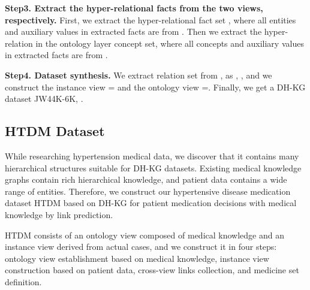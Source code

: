 \documentclass[letterpaper]{article} \usepackage{aaai23}  \usepackage{times}  \usepackage{helvet}  \usepackage{courier}  \usepackage[hyphens]{url}  \usepackage{graphicx} \urlstyle{rm} \def\UrlFont{\rm}  \usepackage{natbib}  \usepackage{caption} \frenchspacing  \setlength{\pdfpagewidth}{8.5in}  \setlength{\pdfpageheight}{11in}  \usepackage{times}
\begin{document}
\begin{table}[t]
\small
\centering
{}
\caption{\label{T3}
The usage of dataset partition in instance-view LP, ontology-view LP, and ET tasks of DH-KG.
}
\end{table}


\textbf{Step3. Extract the hyper-relational facts from the two views, respectively.} 
First, we extract the hyper-relational fact set , where all entities and auxiliary values in extracted facts are from . Then we extract the hyper-relation  in the ontology layer concept set, where all concepts and auxiliary values in extracted facts are from .

\textbf{Step4. Dataset synthesis.} 
We extract relation set from ,  as , , and we construct the instance view  = and the ontology view =. Finally, we get a DH-KG dataset JW44K-6K, .









\subsection{HTDM Dataset}
While researching hypertension medical data, we discover that it contains many hierarchical structures suitable for DH-KG datasets. Existing medical knowledge graphs contain rich hierarchical knowledge, and patient data contains a wide range of entities. Therefore, we construct our hypertensive disease medication dataset HTDM based on DH-KG for patient medication decisions with medical knowledge by link prediction.

HTDM consists of an ontology view composed of medical knowledge and an instance view derived from actual cases, and we construct it in four steps: ontology view establishment based on medical knowledge, instance view construction based on patient data, cross-view links collection, and medicine set definition. 
\end{document}
